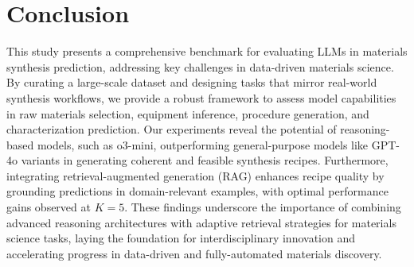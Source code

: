 \section{Conclusion}
\label{sec:conclusion}

This study presents a comprehensive benchmark for evaluating LLMs in materials synthesis prediction, addressing key challenges in data-driven materials science. By curating a large-scale dataset and designing tasks that mirror real-world synthesis workflows, we provide a robust framework to assess model capabilities in raw materials selection, equipment inference, procedure generation, and characterization prediction. Our experiments reveal the potential of reasoning-based models, such as o3-mini, outperforming general-purpose models like GPT-4o variants in generating coherent and feasible synthesis recipes. Furthermore, integrating retrieval-augmented generation (RAG) enhances recipe quality by grounding predictions in domain-relevant examples, with optimal performance gains observed at \(K=5\). These findings underscore the importance of combining advanced reasoning architectures with adaptive retrieval strategies for materials science tasks, laying the foundation for interdisciplinary innovation and accelerating progress in data-driven and fully-automated materials discovery.

